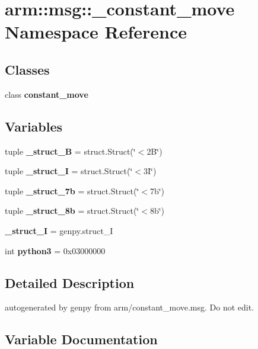\section{arm\-:\-:msg\-:\-:\-\_\-constant\-\_\-move \-Namespace \-Reference}
\label{namespacearm_1_1msg_1_1__constant__move}
\subsection*{\-Classes}
\begin{DoxyCompactItemize}
\item 
class {\bf constant\-\_\-move}
\end{DoxyCompactItemize}
\subsection*{\-Variables}
\begin{DoxyCompactItemize}
\item 
tuple {\bf \-\_\-struct\-\_\-B} = struct.\-Struct(\char`\"{}$<$2\-B\char`\"{})
\item 
tuple {\bf \-\_\-struct\-\_\-I} = struct.\-Struct(\char`\"{}$<$3\-I\char`\"{})
\item 
tuple {\bf \-\_\-struct\-\_\-7b} = struct.\-Struct(\char`\"{}$<$7b\char`\"{})
\item 
tuple {\bf \-\_\-struct\-\_\-8b} = struct.\-Struct(\char`\"{}$<$8b\char`\"{})
\item 
{\bf \-\_\-struct\-\_\-\-I} = genpy.\-struct\-\_\-\-I
\item 
int {\bf python3} = 0x03000000
\end{DoxyCompactItemize}


\subsection{\-Detailed \-Description}
\begin{DoxyVerb}autogenerated by genpy from arm/constant_move.msg. Do not edit.\end{DoxyVerb}
 

\subsection{\-Variable \-Documentation}

